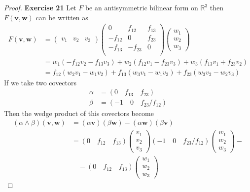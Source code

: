 \documentclass[11pt]{article}
\newcommand{\R}{\mathbb{R}}
\theoremstyle{definition}
\begin{document}
\begin{proof}{\textbf{Exercise 21}}
    Let $F$ be an antisymmetric bilinear form on $\R^3$ then $F(\bm{v}, \bm{w})$
    can be written as
    \begin{align*}
        F(\bm{v}, \bm{w}) &= \begin{pmatrix} v_1 & v_2 & v_3 \end{pmatrix}
        \begin{pmatrix}
            0 & f_{12} & f_{13}\\
            -f_{12} & 0 & f_{23}\\
            -f_{13} & -f_{23} & 0\\
        \end{pmatrix}
        \begin{pmatrix} w_1 \\ w_2 \\ w_3\end{pmatrix}\\
        &= w_1(-f_{12}v_2 -f_{13}v_3) + w_2(f_{12}v_1 - f_{23}v_3)
        + w_3(f_{13}v_1 + f_{23}v_2)\\
        &= f_{12}(w_2v_1 - w_1v_2) + f_{13}(w_3v_1 - w_1v_3)
        + f_{23}(w_3v_2 - w_2v_3)
    \end{align*}
    If we take two covectors
    \begin{align*}
        \alpha &= (0 \quad f_{13}\quad f_{23})\\
        \beta &= (-1\quad 0\quad f_{23}/f_{12})
    \end{align*}
    Then the wedge product of this covectors become
    \begin{align*}
        (\alpha \wedge\beta)(\bm{v}, \bm{w})
        &= (\alpha\bm{v})(\beta\bm{w}) - (\alpha\bm{w})(\beta\bm{v})\\
        &= (0\quad f_{12}\quad f_{13})
        \begin{pmatrix} v_1 \\ v_2 \\ v_3\end{pmatrix}
        (-1\quad 0\quad f_{23}/f_{12})
        \begin{pmatrix} w_1 \\ w_2 \\ w_3\end{pmatrix} -\\
        &\quad - (0\quad f_{12}\quad f_{13})
        \begin{pmatrix} w_1 \\ w_2 \\ w_3\end{pmatrix}

\end{align*}
\end{proof}
\end{document}
